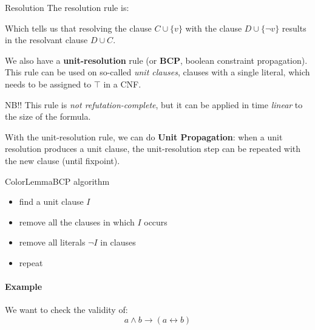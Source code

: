 \documentclass[a4paper, 11pt]{report}
\begin{document}
\begin{defframe}{Resolution}{}
The resolution rule is:
\vspace{-1em}
\begin{prooftree}
\end{prooftree}
Which tells us that resolving the clause $C \cup \{v\}$ with the clause $D \cup \{\neg v\}$ results in the resolvant clause $D \cup C$.

We also have a \textbf{unit-resolution} rule (or \textbf{BCP}, boolean constraint propagation). This rule can be used on so-called \textit{unit clauses}, clauses with a single literal, which needs to be assigned to $\top$ in a CNF.

\begin{prooftree}
\end{prooftree}
\begin{gframe}{NB!!}
    This rule is \textit{not refutation-complete}, but  it can be applied in time \textit{linear} to the size of the formula.
\end{gframe}
\end{defframe}

With the unit-resolution rule, we can do \textbf{Unit Propagation}: when a unit resolution produces a unit clause, the unit-resolution step can be repeated with the new clause (until fixpoint).

\begin{cframe}{ColorLemma}{BCP algorithm}
    \begin{itemize}
        \item find a unit clause $I$
        \item remove all the clauses in which $I$ occurs
        \item remove all literals $\neg I$ in clauses
        \item repeat
    \end{itemize}
\end{cframe}

\paragraph{Example}
We want to check the validity of:
$$a \land b \to (a \leftrightarrow b)$$
\end{document}
